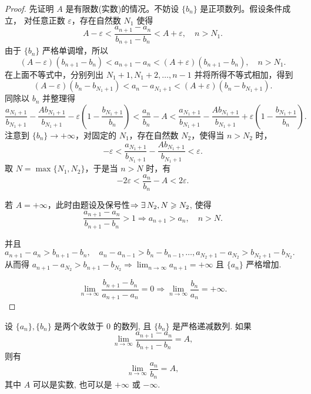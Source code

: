 \begin{proof}
    先证明 $A$ 是有限数(实数)的情况。不妨设 $\{b_n\}$ 是正项数列。假设条件成立，
    对任意正数 $\varepsilon$，存在自然数 $N_1$ 使得
    $$
        A - \varepsilon < \frac{a_{n+1} - a_n}{b_{n+1} - b_n} < A + \varepsilon, \quad n > N_1.
    $$
    由于 $\{b_n\}$ 严格单调增，所以
    $$
        (A - \varepsilon)(b_{n+1} - b_n) < a_{n+1} - a_n < (A + \varepsilon)(b_{n+1} - b_n), \quad n > N_1.
    $$
    在上面不等式中，分别列出 $N_1 + 1, N_1 + 2, \dots, n - 1$ 并将所得不等式相加，得到
    $$
        (A - \varepsilon)(b_n - b_{N_1 + 1}) < a_n - a_{N_1 + 1} < (A + \varepsilon)(b_n - b_{N_1 + 1}).
    $$
    同除以 $b_n$ 并整理得
    $$
        \frac{a_{N_1 + 1}}{b_{N_1 + 1}} - \frac{A b_{N_1 + 1}}{b_{N_1 + 1}} - \varepsilon \left( 1 - \frac{b_{N_1 + 1}}{b_n} \right) < \frac{a_n}{b_n} - A < \frac{a_{N_1 + 1}}{b_{N_1 + 1}} - \frac{A b_{N_1 + 1}}{b_{N_1 + 1}} + \varepsilon \left( 1 - \frac{b_{N_1 + 1}}{b_n} \right).
    $$
    注意到 $\{b_n\} \to +\infty$，对固定的 $N_1$，存在自然数 $N_2$，使得当 $n > N_2$ 时，
    $$
        -\varepsilon < \frac{a_{N_1 + 1}}{b_{N_1 + 1}} - \frac{A b_{N_1 + 1}}{b_{N_1 + 1}} < \varepsilon.
    $$
    取 $N = \max\{N_1, N_2\}$，于是当 $n > N$ 时，有
    $$
        -2\varepsilon < \frac{a_n}{b_n} - A < 2\varepsilon.
    $$

    若 $A = +\infty$，此时由题设及保号性$\Rightarrow \exists N_2, N \ges N_2$, 使得
    $$
        \frac{a_{n+1} - a_n}{b_{n+1} - b_n} > 1 \Rightarrow a_{n+1} > a_n, \quad n > N.
    $$

    并且
    $
        a_{n+1} - a_n > b_{n+1} - b_n, \quad a_n - a_{n-1} > b_n - b_{n-1}, \dots, a_{N_2+1} - a_{N_2} > b_{N_2+1} - b_{N_2}.
    $
    从而得
    $
        a_{n+1} - a_{N_2} > b_{n+1} - b_{N_2} \Rightarrow \lim_{n \to \infty} a_{n+1} = +\infty$ 且  $\{a_n\}$ {严格增加}.

    $$
        \lim_{n \to \infty} \frac{b_{n+1} - b_n}{a_{n+1} - a_n} = 0 \Rightarrow \lim_{n \to \infty} \frac{b_n}{a_n} = +\infty.
    $$

\end{proof}

\begin{theorem} \label{thm:Stolz_zero}
    设 $\{a_n\}, \{b_n\}$ 是两个收敛于 $0$ 的数列, 且 $\{b_n\}$ 是严格递减数列. 如果
    $$ \lim_{n\to\infty} \frac{a_{n+1} - a_n}{b_{n+1} - b_n} = A, $$
    则有
    $$ \lim_{n\to\infty} \frac{a_n}{b_n} = A, $$
    其中 $A$ 可以是实数, 也可以是 $+\infty$ 或 $-\infty$.
\end{theorem}

